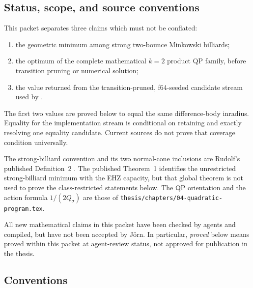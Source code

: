 %

\subsection{Status, scope, and source conventions}
\label{subsec:product-two-bounce-status}

This packet separates three claims which must not be conflated:
\begin{enumerate}
  \item the geometric minimum among strong two-bounce Minkowski billiards;
  \item the optimum of the complete mathematical \(k=2\) product QP family,
    before transition pruning or numerical solution;
  \item the value returned from the transition-pruned, f64-seeded candidate
    stream used by
    .
\end{enumerate}
The first two values are proved below to equal the same difference-body
inradius.  Equality for the implementation stream is conditional on retaining
and exactly resolving one equality candidate.  Current sources do not prove
that coverage condition universally.

The strong-billiard convention and its two normal-cone inclusions are
Rudolf's published Definition~2 \cite[Definition~2]{Rudolf2022}.  The
published Theorem~1 identifies the unrestricted strong-billiard minimum with
the EHZ capacity, but that global theorem is not used to prove the
class-restricted statements below.  The QP orientation and the action formula
\(1/(2Q_\sigma)\) are those of
\texttt{thesis/chapters/04-quadratic-program.tex}.

\begin{unverified}
All new mathematical claims in this packet have been checked by agents and
compiled, but have not been accepted by Jörn.  In particular, \emph{proved}
below means proved within this packet at agent-review status, not approved for
publication in the thesis.
\end{unverified}

\subsection{Conventions}
\label{subsec:product-two-bounce-conventions}

